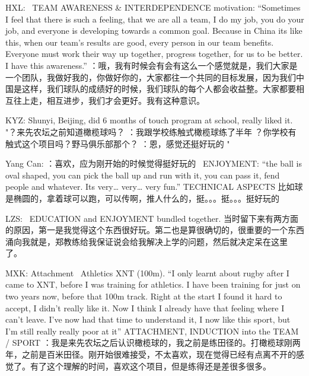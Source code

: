 \begin{CJK}{UTF8}{gbsn}
        HXL:
         TEAM AWARENESS & INTERDEPENDENCE motivation: “Sometimes I feel that there is such a feeling, that we are all a team, I do my job, you do your job, and everyone is developing towards a common goal.  Because in China its like this, when our team’s results are good, every person in our team benefits.  Everyone must work their way up together, progress together, for us to be better. I have this awareness.”	：哦，我有时候会有会有这么一个感觉就是，我们大家是一个团队，我做好我的，你做好你的，大家都往一个共同的目标发展，因为我们中国是这样，我们球队的成绩好的时候，我们球队的每个人都会收益整。大家都要相互往上走，相互进步，我们才会更好。我有这种意识。 






KYZ:
Shunyi, Beijing, did 6 months of touch program at school, really liked it.	"？来先农坛之前知道橄榄球吗？
：我跟学校练触式橄榄球练了半年
？你学校有触式这个项目吗？野马俱乐部那个？
：恩，感觉还挺好玩的
"

Yang Can:
：喜欢，应为刚开始的时候觉得挺好玩的
 ENJOYMENT: “the ball is oval shaped, you can pick the ball up and run with it, you can pass it, fend people and whatever.  Its very… very… very fun.” TECHNICAL ASPECTS 	比如球是椭圆的，拿着球可以跑，可以传啊，推人什么的，挺。。。挺。。。挺好玩的 

LZS:
 EDUCATION and ENJOYMENT bundled together.  	当时留下来有两方面的原因，第一是我觉得这个东西很好玩。第二也是算很确切的，很重要的一个东西涌向我就是，郑教练给我保证说会给我解决上学的问题，然后就决定呆在这里了。 










MXK: Attachment
 Athletics XNT (100m).  “I only learnt about rugby after I came to XNT, before I was training for athletics. I have been training for just on two years now, before that 100m track.  Right at the start I found it hard to accept, I didn’t really like it. Now I think I already have that feeling where I can’t leave.  I’ve now had that time to understand it, I now like this sport, but I’m still really really poor at it”  ATTACHMENT, INDUCTION into the TEAM / SPORT	：我是来先农坛之后认识橄榄球的，我之前是练田径的。打橄榄球刚两年，之前是百米田径。刚开始很难接受，不太喜欢，现在觉得已经有点离不开的感觉了。有了这个理解的时间，喜欢这个项目，但是练得还是差很多很多。 


\end{CJK}
